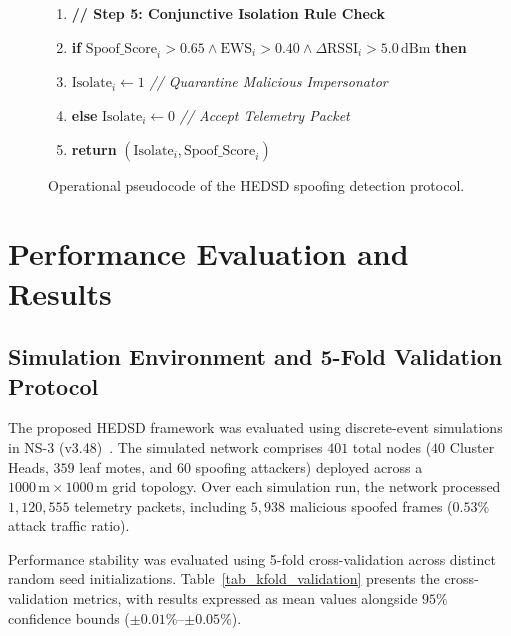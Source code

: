 \documentclass[conference]{IEEEtran}
\begin{document}
\begin{figure}[htbp]
{\begin{minipage}{0.96\columnwidth}
\begin{enumerate}
    \item \textbf{// Step 5: Conjunctive Isolation Rule Check}
    \item \textbf{if} $\text{Spoof\_Score}_i > 0.65 \land \text{EWS}_i > 0.40 \land \Delta\text{RSSI}_i > 5.0\,\text{dBm}$ \textbf{then}
    \item \quad $\text{Isolate}_i \leftarrow 1$ \quad \textit{// Quarantine Malicious Impersonator}
    \item \textbf{else} $\text{Isolate}_i \leftarrow 0$ \quad \textit{// Accept Telemetry Packet}
    \item \textbf{return} $(\text{Isolate}_i, \text{Spoof\_Score}_i)$
\end{enumerate}
\end{minipage}
}
\caption{Operational pseudocode of the HEDSD spoofing detection protocol.}
\label{fig_alg_iah_edsd}
\end{figure}

\section{Performance Evaluation and Results}
\label{sec_results}

\subsection{Simulation Environment and 5-Fold Validation Protocol}
The proposed HEDSD framework was evaluated using discrete-event simulations in NS-3 (v3.48)~\cite{ref_ns3_official_36, ref_netanim_37}. The simulated network comprises $401$ total nodes ($40$ Cluster Heads, $359$ leaf motes, and $60$ spoofing attackers) deployed across a $1000\,\text{m} \times 1000\,\text{m}$ grid topology. Over each simulation run, the network processed $1,120,555$ telemetry packets, including $5,938$ malicious spoofed frames ($0.53\%$ attack traffic ratio).

Performance stability was evaluated using 5-fold cross-validation across distinct random seed initializations. Table~\ref{tab_kfold_validation} presents the cross-validation metrics, with results expressed as mean values alongside $95\%$ confidence bounds ($\pm 0.01\%$--$\pm 0.05\%$).
\end{document}
